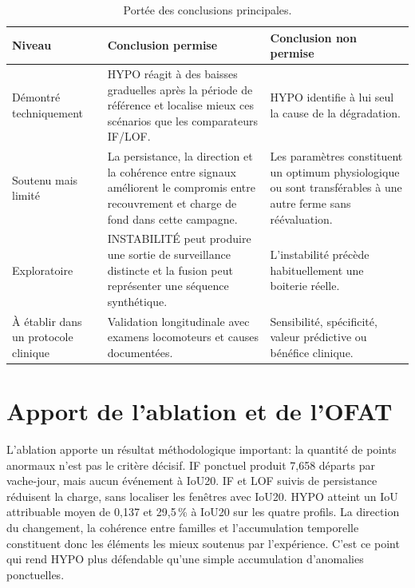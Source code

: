 \begin{table}[H]
  \centering
  \caption{Portée des conclusions principales.}
  \label{tab:portee_conclusions}
  \small
  \begin{tabular}{p{}p{}p{}}
    \toprule
    Niveau & Conclusion permise & Conclusion non permise \\
    \midrule
    Démontré techniquement
      & HYPO réagit à des baisses graduelles après la période de référence et localise mieux ces scénarios
        que les comparateurs IF/LOF.
      & HYPO identifie à lui seul la cause de la dégradation. \\
    Soutenu mais limité
      & La persistance, la direction et la cohérence entre signaux améliorent le compromis
        entre recouvrement et charge de fond dans cette campagne.
      & Les paramètres constituent un optimum physiologique ou sont transférables à une
        autre ferme sans réévaluation. \\
    Exploratoire
      & INSTABILITÉ peut produire une sortie de surveillance distincte et la fusion peut
        représenter une séquence synthétique.
      & L'instabilité précède habituellement une boiterie réelle. \\
    À établir dans un protocole clinique
      & Validation longitudinale avec examens locomoteurs et causes documentées.
      & Sensibilité, spécificité, valeur prédictive ou bénéfice clinique. \\
    \bottomrule
  \end{tabular}
\end{table}

\section{Apport de l'ablation et de l'OFAT}

L'ablation apporte un résultat méthodologique important: la quantité de points anormaux n'est
pas le critère décisif. IF
ponctuel produit 7,658 départs par vache-jour, mais aucun événement à IoU20. IF et LOF suivis
de persistance réduisent la charge, sans localiser les fenêtres avec IoU20. HYPO atteint un
IoU attribuable moyen de 0,137 et 29,5\,\% à IoU20 sur les quatre profils. La direction du
changement, la cohérence entre familles et l'accumulation temporelle constituent donc les
éléments les mieux soutenus par l'expérience. C'est ce point qui rend HYPO plus défendable
qu'une simple accumulation d'anomalies ponctuelles.

